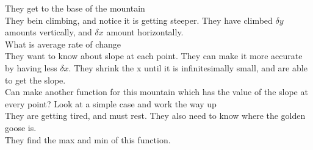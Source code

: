 
They get to the base of the mountain \\ 
They bein climbing, and notice it is getting steeper. They have climbed $\delta y$ amounts vertically, and $\delta x $ amount horizontally. \\ 
What is average rate of change \\
They want to know about slope at each point. They can make it more accurate by having less $\delta x$. They shrink the x until it is infinitesimally small, and are able to get the slope.\\ 
Can make another function for this mountain which has the value of the slope at every point? Look at a simple case and work the way up \\
They are getting tired, and must rest. They also need to know where the golden goose is. \\
\indent They find the max and min of this function.
\pagebreak